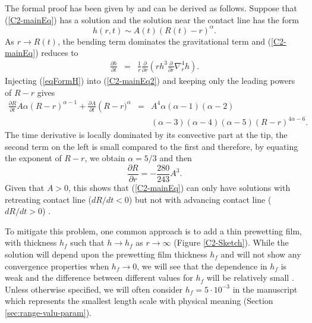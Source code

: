 The formal proof  has been given by \citet{Flitton:1999iv}  and can be
derived as follows.  Suppose that  (\ref{C2-mainEq}) has a solution and
the solution near the contact line has the form
\begin{equation}
  h(r,t) \sim A(t)(R(t)-r)^{\alpha}.
  \label{eqFormH}
\end{equation}
As $r \rightarrow R(t)$, the  bending term dominates the gravitational
term and (\ref{C2-mainEq}) reduces to
\begin{eqnarray}
  \frac{\partial       h}{\partial       t}&      =&\frac{1}{       r}
                                                     \frac{\partial}{\partial r}\left( rh^3 \frac{\partial}{\partial r}\nabla_r^4h\right).
                                                     \label{C2-mainEq2}
\end{eqnarray}
Injecting (\ref{eqFormH}) into (\ref{C2-mainEq2}) and keeping only the
leading powers of $R-r$ gives
\begin{eqnarray}
  \frac{\partial    R}{\partial    t}    A\alpha\left(R-r\right)^{\alpha-1}+
  \frac{\partial           A}{\partial           t}\left(R-r)^{\alpha}
  &=&A^4\alpha(\alpha-1)(\alpha-2)\nonumber\\
  &&(\alpha-3)(\alpha-4)(\alpha-5)(R-r)^{4\alpha-6}.\nonumber
\end{eqnarray}
The time derivative is locally dominated by its convective part at the
tip, the second  term on the left  is small compared to  the first and
therefore, by equating the exponent of $R-r$, we obtain $\alpha = 5/3$
and then
\begin{equation}
  \frac{\partial R}{\partial r} =-\frac{280}{243} A^3.
\end{equation}
Given  that $A>0$,  this shows  that (\ref{C2-mainEq})  can only  have
solutions  with  retreating  contact  line ($dR/dt<0$)  but  not  with
advancing             contact             line             ($dR/dt>0$)
\citep{Lister:2013ia,Flitton:1999iv}.

To  mitigate this  problem,  one  common approach  is  to  add a  thin
prewetting film, with thickness $h_f$  such that $h\rightarrow h_f$ as
$r\rightarrow  \infty$ (Figure  \ref{C2-Sketch}).  While  the solution
will depend upon the prewetting film thickness $h_f$ and will not show
any convergence properties  when $h_f\rightarrow 0$, we  will see that
the dependence in  $h_f$ is weak and the  difference between different
values      for      $h_f$      will     be      relatively      small
\citep{Lister:2013ia,Anonymous:QWXp_4JV}.  Unless otherwise specified,
we will often consider $h_f =  5\cdot 10^{-3}$ in the manuscript which
represents the  smallest length  scale with physical  meaning (Section
\ref{sec:range-valu-param}).



